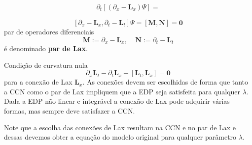\documentclass[25pt]{article}
\numberwithin{equation}{subsection} %
\newcommand{\commutador}[2]{\left[#1,#2\right]}
\begin{document}
\begin{align}
\partial_t\left[\left(\partial_x-\mathbf{L}_x\right)\bm{\varPsi}\right]=
\end{align}


\begin{equation}
\commutador{\partial_x-\mathbf{L}_x}{\partial_t-\mathbf{L}_t}\bm{\varPsi}=\commutador{\mathbf{M}}{\mathbf{N}}=\mathbf{0}
\end{equation}
par de operadores diferenciais $$\mathbf{M}:=\partial_x-\mathbf{L}_x,~~~~~\mathbf{N}:=\partial_t-\mathbf{L}_t$$
é denominado \textbf{par de Lax}.

Condição de curvatura nula
\begin{equation}
\partial_x\mathbf{L}_t-\partial_t\mathbf{L}_x+\commutador{\mathbf{L}_t}{\mathbf{L}_x}=\mathbf{0}
\end{equation}
para a conexão de Lax $\mathbf{L}_x$. As conexões devem ser escolhidas de forma que tanto a CCN como o par de Lax impliquem que a EDP seja satisfeita para qualquer $\lambda$. Dada a EDP não linear e integrável a conexão de Lax pode adquirir várias formas, mas sempre deve satisfazer a CCN.

Note que a escolha das conexões de Lax resultam na CCN e no par de Lax e dessas devemos obter a equação do modelo original para qualquer parâmetro $\lambda$.
\end{document}
